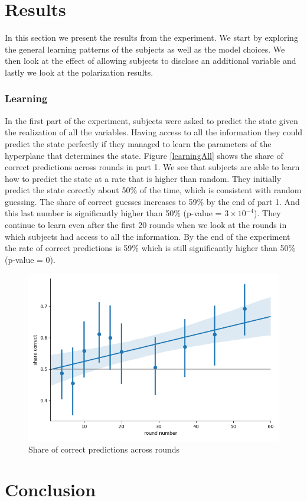 \documentclass[
  12pt,
]{article}
\begin{document}
\hypertarget{results}{%
\section{Results}\label{results}}

In this section we present the results from the experiment. We start by
exploring the general learning patterns of the subjects as well as the
model choices. We then look at the effect of allowing subjects to
disclose an additional variable and lastly we look at the polarization
results.

\hypertarget{learning}{%
\subsubsection{Learning}\label{learning}}

In the first part of the experiment, subjects were asked to predict the
state given the realization of all the variables. Having access to all
the information they could predict the state perfectly if they managed
to learn the parameters of the hyperplane that determines the state.
Figure \ref{learningAll} shows the share of correct predictions across
rounds in part 1. We see that subjects are able to learn how to predict
the state at a rate that is higher than random. They initially predict
the state corectly about 50\% of the time, which is consistent with
random guessing. The share of correct guesses increases to 59\% by the
end of part 1. And this last number is significantly higher than 50\%
(p-value = \ensuremath{3\times 10^{-4}}). They continue to learn even
after the first 20 rounds when we look at the rounds in which subjects
had access to all the information. By the end of the experiment the rate
of correct predictions is 59\% which is still significantly higher than
50\% (p-value = 0).

\begin{figure}

{\centering \includegraphics[width=0.5\linewidth]{../computed_objects/figures/learning_all} 

}

\caption{\label{learningAll} Share of correct predictions across rounds}\label{fig:learningAll}
\end{figure}

\hypertarget{conclusion}{%
\section{Conclusion}\label{conclusion}}

\renewcommand\refname{Appendix}
  
\end{document}
